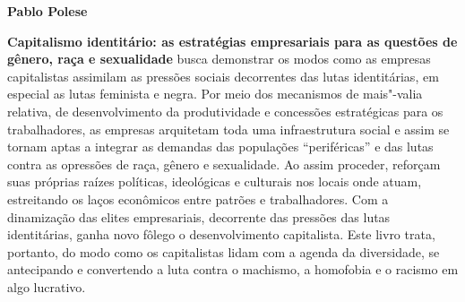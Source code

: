 \textbf{Pablo Polese} \lipsum[1]

\textbf{Capitalismo identitário: as estratégias empresariais para as questões de gênero, raça e sexualidade} busca demonstrar os modos como as empresas capitalistas assimilam as
pressões sociais decorrentes das lutas identitárias, em especial as
lutas feminista e negra. Por meio dos mecanismos de mais"-valia relativa,
de desenvolvimento da produtividade e concessões estratégicas para os
trabalhadores, as empresas arquitetam toda uma infraestrutura social e
assim se tornam aptas a integrar as demandas das populações
``periféricas'' e das lutas contra as opressões de raça, gênero e
sexualidade. Ao assim proceder, reforçam suas próprias raízes políticas,
ideológicas e culturais nos locais onde atuam, estreitando os laços
econômicos entre patrões e trabalhadores. Com a dinamização das elites
empresariais, decorrente das pressões das lutas identitárias, ganha novo
fôlego o desenvolvimento capitalista. Este livro trata, portanto, do
modo como os capitalistas lidam com a agenda da diversidade, se
antecipando e convertendo a luta contra o machismo, a homofobia e o
racismo em algo lucrativo.

